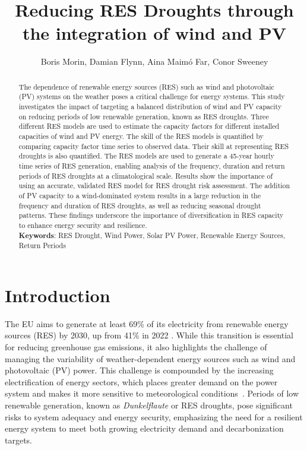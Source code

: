 \documentclass[a4paper, 11p1t]{article}
\title{Reducing RES Droughts through the integration of wind and PV}
\author{Boris Morin, Damian Flynn, Aina Maimó Far, Conor Sweeney}
\begin{document}
\maketitle

\begin{abstract}

\noindent The dependence of renewable energy sources (RES) such as wind and photovoltaic (PV) systems on the weather poses a critical challenge for energy systems. This study investigates the impact of targeting a balanced distribution of wind and PV capacity on reducing periods of low renewable generation, known as RES droughts. Three different RES models are used to estimate the capacity factors for different installed capacities of wind and PV energy. The skill of the RES models is quantified by comparing capacity factor time series to observed data. Their skill at representing RES droughts is also quantified. The RES models are used to generate a 45-year hourly time series of RES generation, enabling analysis of the frequency, duration and return periods of RES droughts at a climatological scale. Results show the importance of using an accurate, validated RES model for RES drought risk assessment. The addition of PV capacity to a wind-dominated system results in a large reduction in the frequency and duration of RES droughts, as well as reducing seasonal drought patterns. These findings underscore the importance of diversification in RES capacity to enhance energy security and resilience. \\

\textbf{Keywords}: RES Drought, Wind Power, Solar PV Power, Renewable Energy Sources, Return Periods
\end{abstract}

\section{Introduction}
\label{sec:Intro}

The EU aims to generate at least 69\% of its electricity from renewable energy sources (RES) by 2030, up from 41\% in 2022 \cite{eurostat2023share}. While this transition is essential for reducing greenhouse gas emissions, it also highlights the challenge of managing the variability of weather-dependent energy sources such as wind and photovoltaic (PV) power. This challenge is compounded by the increasing electrification of energy sectors, which places greater demand on the power system and makes it more sensitive to meteorological conditions~\cite{bloomfield2021, bloomfield2016, vanderWiel2019drought}. Periods of low renewable generation, known as \textit{Dunkelflaute} or RES droughts, pose significant risks to system adequacy and energy security, emphasizing the need for a resilient energy system to meet both growing electricity demand and decarbonization targets.
\end{document}
